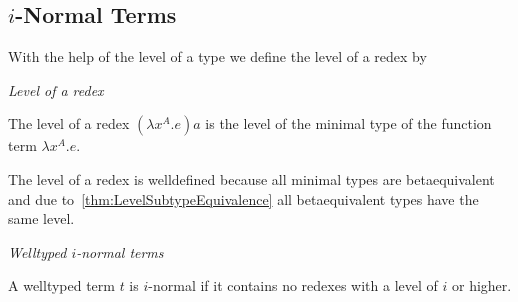 \subsection{$i$-Normal Terms}

With the help of the level of a type we define the level of a redex by
\begin{definition}
    \emph{Level of a redex}

    The level of a redex $(\lambda x^A. e) a$ is the level of the minimal type of
    the function term $\lambda x^A. e$.
\end{definition}

The level of a redex is welldefined because all minimal types are betaequivalent
and due to~\ref{thm:LevelSubtypeEquivalence} all betaequivalent types have the
same level.



\begin{definition}
    \emph{Welltyped $i$-normal terms}

    A welltyped term $t$ is $i$-normal if it contains no redexes with a level of
    $i$ or higher.
\end{definition}




